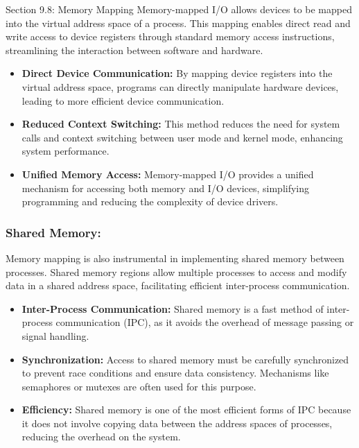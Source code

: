 \begin{notes}{Section 9.8: Memory Mapping}
    Memory-mapped I/O allows devices to be mapped into the virtual address space of a process. This mapping enables direct read and write access to device registers through standard memory access 
    instructions, streamlining the interaction between software and hardware.
    
    \begin{itemize}
        \item \textbf{Direct Device Communication:} By mapping device registers into the virtual address space, programs can directly manipulate hardware devices, leading to more efficient device communication.
        \item \textbf{Reduced Context Switching:} This method reduces the need for system calls and context switching between user mode and kernel mode, enhancing system performance.
        \item \textbf{Unified Memory Access:} Memory-mapped I/O provides a unified mechanism for accessing both memory and I/O devices, simplifying programming and reducing the complexity of device drivers.
    \end{itemize}
    
    \subsubsection*{Shared Memory:}
    
    Memory mapping is also instrumental in implementing shared memory between processes. Shared memory regions allow multiple processes to access and modify data in a shared address space, facilitating 
    efficient inter-process communication.
    
    \begin{itemize}
        \item \textbf{Inter-Process Communication:} Shared memory is a fast method of inter-process communication (IPC), as it avoids the overhead of message passing or signal handling.
        \item \textbf{Synchronization:} Access to shared memory must be carefully synchronized to prevent race conditions and ensure data consistency. Mechanisms like semaphores or mutexes are often 
        used for this purpose.
        \item \textbf{Efficiency:} Shared memory is one of the most efficient forms of IPC because it does not involve copying data between the address spaces of processes, reducing the overhead on 
        the system.
    \end{itemize}
    

\end{notes}
